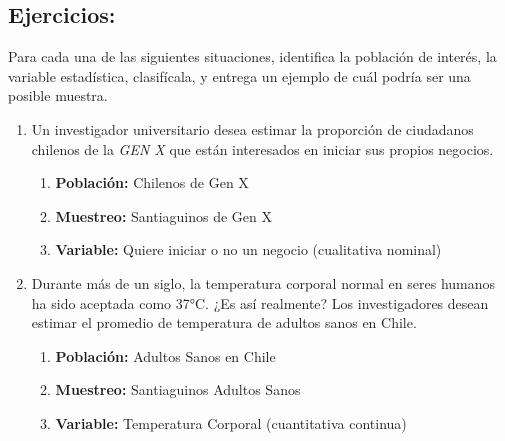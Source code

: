 \documentclass[12pt, letterpaper]{article}
\begin{document}
\subsection{Ejercicios:}
Para cada una de las siguientes situaciones, identifica la población de interés, la variable estadística, clasifícala, y entrega un ejemplo de cuál podría ser una posible muestra.

\begin{enumerate}
    \item Un investigador universitario desea estimar la proporción de ciudadanos chilenos de la \textit{GEN X} que están interesados en iniciar sus propios negocios.
        \begin{enumerate}
            \item \textbf{Población:} Chilenos de Gen X
            \item \textbf{Muestreo:} Santiaguinos de Gen X
            \item \textbf{Variable:} Quiere iniciar o no un negocio (cualitativa nominal)
        \end{enumerate}

    \item Durante más de un siglo, la temperatura corporal normal en seres humanos ha sido aceptada como 37°C. ¿Es así realmente? Los investigadores desean estimar el promedio de temperatura de adultos sanos en Chile.
        \begin{enumerate}
            \item \textbf{Población:} Adultos Sanos en Chile %
            \item \textbf{Muestreo:} Santiaguinos Adultos Sanos
            \item \textbf{Variable:} Temperatura Corporal (cuantitativa continua) %
        \end{enumerate}


\end{enumerate}
\end{document}
